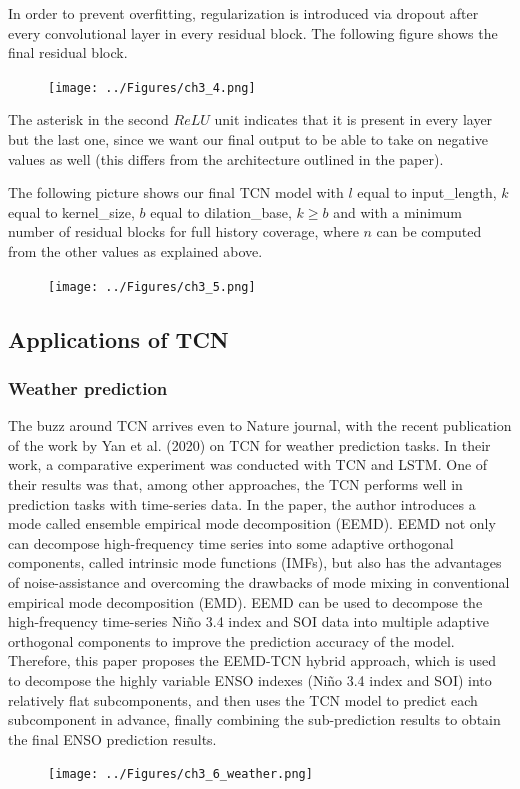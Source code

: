 In order to prevent overfitting, regularization is introduced via dropout after every convolutional layer in every residual block. The following figure shows the final residual block.
\begin{figure}[H]
    \texttt{[image: ../Figures/ch3\_4.png]}
\end{figure}
The asterisk in the second $ReLU$ unit indicates that it is present in every layer but the last one, since we want our final output to be able to take on negative values as well (this differs from the architecture outlined in the paper).

The following picture shows our final TCN model with $l$ equal to input\_length, $k$ equal to kernel\_size, $b$ equal to dilation\_base, $k\geq b$ and with a minimum number of residual blocks for full history coverage, where $n$ can be computed from the other values as explained above.
\begin{figure}[H]
    \texttt{[image: ../Figures/ch3\_5.png]}
\end{figure}


\subsection{Applications of TCN}

\subsubsection{Weather prediction}
The buzz around TCN arrives even to Nature journal, with the recent publication of the work by Yan et al. (2020) on TCN for weather prediction tasks. In their work, a comparative experiment was conducted with TCN and LSTM. One of their results was that, among other approaches, the TCN performs well in prediction tasks with time-series data.
In the paper, the author introduces a mode called ensemble empirical mode decomposition (EEMD). EEMD not only can decompose high-frequency time series into some adaptive orthogonal components, called intrinsic mode functions (IMFs), but also has the advantages of noise-assistance and overcoming the drawbacks of mode mixing in conventional empirical mode decomposition (EMD). EEMD can be used to decompose the high-frequency time-series Niño 3.4 index and SOI data into multiple adaptive orthogonal components to improve the prediction accuracy of the model. Therefore, this paper proposes the EEMD-TCN hybrid approach, which is used to decompose the highly variable ENSO indexes (Niño 3.4 index and SOI) into relatively flat subcomponents, and then uses the TCN model to predict each subcomponent in advance, finally combining the sub-prediction results to obtain the final ENSO prediction results.
\begin{figure}[H]
    \texttt{[image: ../Figures/ch3\_6\_weather.png]}
\end{figure}


